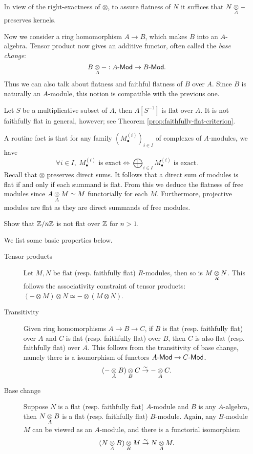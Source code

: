 \begin{remark}
	In view of the right-exactness of $\otimes$, to assure flatness of $N$ it suffices that $N \underset{A}{\otimes} -$ preserves kernels.
\end{remark}

Now we consider a ring homomorphism $A \to B$, which makes $B$ into an $A$-algebra. Tensor product now gives an additive functor, often called the \emph{base change}:
\[ B \underset{A}{\otimes} -: A\text{-}\mathsf{Mod} \to B\text{-}\mathsf{Mod}. \]
Thus we can also talk about flatness and faithful flatness of $B$ over $A$. Since $B$ is naturally an $A$-module, this notion is compatible with the previous one.
\begin{example}\label{eg:localization-flatness}
	Let $S$ be a multiplicative subset of $A$, then $A[S^{-1}]$ is flat over $A$. It is not faithfully flat in general, however; see Theorem \ref{prop:faithfully-flat-criterion}.
\end{example}

\begin{example}
	A routine fact is that for any family $\left( M^{(i)}_\bullet \right)_{i \in I}$ of complexes of $A$-modules, we have
	\[ \forall i \in I, \; M^{(i)}_\bullet \text{ is exact} \iff \bigoplus_{i \in I} M^{(i)}_\bullet \text{ is exact}. \]
	Recall that $\otimes$ preserves direct sums. It follows that a direct sum of modules is flat if and only if each summand is flat. From this we deduce the flatness of free modules since $A \underset{A}{\otimes} M \simeq M$ functorially for each $M$. Furthermore, projective modules are flat as they are direct summands of free modules.
\end{example}

\begin{exercise}
	Show that $\mathbb{Z}/n\mathbb{Z}$ is not flat over $\mathbb{Z}$ for $n > 1$.
\end{exercise}

We list some basic properties below.
\begin{description}
	\item[Tensor products] Let $M,N$ be flat (resp. faithfully flat) $R$-modules, then so is $M \underset{R}{\otimes} N$. This follows the associativity constraint of tensor products: $(- \otimes M) \otimes N \simeq - \otimes (M \otimes N)$.
	\item[Transitivity] Given ring homomorphisms $A \to B \to C$, if $B$ is flat (resp. faithfully flat) over $A$ and $C$ is flat (resp. faithfully flat) over $B$, then $C$ is also flat (resp. faithfully flat) over $A$. This follows from the transitivity of base change, namely there is a isomorphism of functors $A\text{-}\mathsf{Mod} \to C\text{-}\mathsf{Mod}$.
	\[ (- \underset{A}{\otimes} B) \underset{B}{\otimes} C \stackrel{\sim}{\rightarrow} - \underset{A}{\otimes} C. \]
	\item[Base change] Suppose $N$ is a flat (resp. faithfully flat) $A$-module and $B$ is any $A$-algebra, then $N \underset{A}{\otimes} B$ is a flat (resp. faithfully flat) $B$-module. Again, any $B$-module $M$ can be viewed as an $A$-module, and there is a functorial isomorphism
	\[ (N \underset{A}{\otimes} B) \underset{B}{\otimes} M \stackrel{\sim}{\rightarrow} N \underset{A}{\otimes} M. \]
\end{description}


